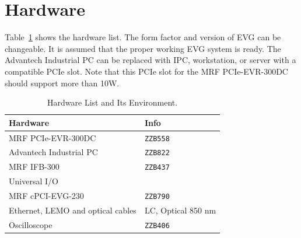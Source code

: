 \documentclass[11pt
  , a4paper
  , article
  , oneside
  , showtrims
]{memoir}
\begin{document}
\section{Hardware}
Table~\ref{table:hwlist} shows the hardware list. The form factor and version of EVG can be changeable. It is assumed that the proper working EVG system is ready. The Advantech Industrial PC can be replaced with IPC, workstation, or server with a compatible PCIe slot. Note that this PCIe slot for the MRF PCIe-EVR-300DC should support more than 10W.
\begin{table}[!hb]
  \centering
  \begin{tabular}{l|l}
    \toprule
    Hardware                          & Info               \\\midrule
    MRF PCIe-EVR-300DC                & \texttt{ZZB558}    \\\midrule
    Advantech Industrial PC           & \texttt{ZZB822}    \\\midrule
    MRF IFB-300                       & \texttt{ZZB437}    \\\midrule
    Universal I/O                     &                    \\\midrule
    MRF cPCI-EVG-230                  & \texttt{ZZB790}    \\\midrule
    Ethernet, LEMO and optical cables & LC, Optical 850 nm \\\midrule
    Oscilloscope                      & \texttt{ZZB406}    \\\bottomrule
  \end{tabular}
  \caption[]{Hardware List and Its Environment.}
  \label{table:hwlist}
\end{table}
\end{document}
